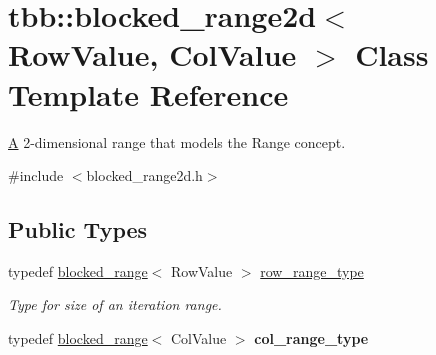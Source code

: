 \hypertarget{classtbb_1_1blocked__range2d}{}\section{tbb\+:\+:blocked\+\_\+range2d$<$ Row\+Value, Col\+Value $>$ Class Template Reference}
\label{classtbb_1_1blocked__range2d}


\hyperlink{structA}{A} 2-\/dimensional range that models the Range concept.  




{\ttfamily \#include $<$blocked\+\_\+range2d.\+h$>$}

\subsection*{Public Types}
\begin{DoxyCompactItemize}
\item 
\hypertarget{classtbb_1_1blocked__range2d_ada609b296a9af0591cc34761b8538100}{}typedef \hyperlink{classtbb_1_1blocked__range}{blocked\+\_\+range}$<$ Row\+Value $>$ \hyperlink{classtbb_1_1blocked__range2d_ada609b296a9af0591cc34761b8538100}{row\+\_\+range\+\_\+type}\label{classtbb_1_1blocked__range2d_ada609b296a9af0591cc34761b8538100}

\begin{DoxyCompactList}\small\item\em Type for size of an iteration range. \end{DoxyCompactList}\item 
\hypertarget{classtbb_1_1blocked__range2d_a9820ed2f2560633d18bf35cece8b6493}{}typedef \hyperlink{classtbb_1_1blocked__range}{blocked\+\_\+range}$<$ Col\+Value $>$ {\bfseries col\+\_\+range\+\_\+type}\label{classtbb_1_1blocked__range2d_a9820ed2f2560633d18bf35cece8b6493}

\end{DoxyCompactItemize}
